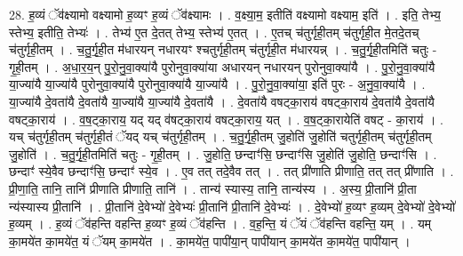 \documentclass[17pt]{extarticle}
\begin{document}
28. ह॒व्यं ॅव॑क्ष्यामो वक्ष्यामो ह॒व्यꣳ ह॒व्यं ॅव॑क्ष्यामः । . व॒क्ष्या॒म॒ इतीति॑ वक्ष्यामो वक्ष्याम॒ इति॑ । . इति॒ तेभ्य॒ स्तेभ्य॒ इतीति॒ तेभ्यः॑ । . तेभ्य॑ ए॒त दे॒तत् तेभ्य॒ स्तेभ्य॑ ए॒तत् । . ए॒तच् च॑तुर्गृही॒तम् च॑तुर्गृही॒त मे॒तदे॒तच् च॑तुर्गृही॒तम् । . च॒तु॒र्गृ॒ही॒त म॑धारयन् नधारयꣳ श्चतुर्गृही॒तम् च॑तुर्गृही॒त म॑धारयन्न् । . च॒तु॒र्गृ॒ही॒तमिति॑ चतुः - गृ॒ही॒तम् । . अ॒धा॒र॒य॒न् पु॒रो॒नु॒वा॒क्या॑यै पुरोनुवा॒क्या॑या अधारयन् नधारयन् पुरोनुवा॒क्या॑यै । . पु॒रो॒नु॒वा॒क्या॑यै या॒ज्या॑यै या॒ज्या॑यै पुरोनुवा॒क्या॑यै पुरोनुवा॒क्या॑यै या॒ज्या॑यै । . पु॒रो॒नु॒वा॒क्या॑या॒ इति॑ पुरः - अ॒नु॒वा॒क्या॑यै । . या॒ज्या॑यै दे॒वता॑यै दे॒वता॑यै या॒ज्या॑यै या॒ज्या॑यै दे॒वता॑यै । . दे॒वता॑यै वषट्का॒राय॑ वषट्का॒राय॑ दे॒वता॑यै दे॒वता॑यै वषट्का॒राय॑ । . व॒ष॒ट्का॒राय॒ यद् यद् व॑षट्का॒राय॑ वषट्का॒राय॒ यत् । . व॒ष॒ट्का॒रायेति॑ वषट् - का॒राय॑ । . यच् च॑तुर्गृही॒तम् च॑तुर्गृही॒तं ॅयद् यच् च॑तुर्गृही॒तम् । . च॒तु॒र्गृ॒ही॒तम् जु॒होति॑ जु॒होति॑ चतुर्गृही॒तम् च॑तुर्गृही॒तम् जु॒होति॑ । . च॒तु॒र्गृ॒ही॒तमिति॑ चतुः - गृ॒ही॒तम् । . जु॒होति॒ छन्दाꣳ॑सि॒ छन्दाꣳ॑सि जु॒होति॑ जु॒होति॒ छन्दाꣳ॑सि । . छन्दाꣳ॑ स्ये॒वैव छन्दाꣳ॑सि॒ छन्दाꣳ॑ स्ये॒व । . ए॒व तत् तदे॒वैव तत् । . तत् प्री॑णाति प्रीणाति॒ तत् तत् प्री॑णाति । . प्री॒णा॒ति॒ तानि॒ तानि॑ प्रीणाति प्रीणाति॒ तानि॑ । . तान्य॑ स्यास्य॒ तानि॒ तान्य॑स्य । . अ॒स्य॒ प्री॒तानि॑ प्री॒ता न्य॑स्यास्य प्री॒तानि॑ । . प्री॒तानि॑ दे॒वेभ्यो॑ दे॒वेभ्यः॑ प्री॒तानि॑ प्री॒तानि॑ दे॒वेभ्यः॑ । . दे॒वेभ्यो॑ ह॒व्यꣳ ह॒व्यम् दे॒वेभ्यो॑ दे॒वेभ्यो॑ ह॒व्यम् । . ह॒व्यं ॅव॑हन्ति वहन्ति ह॒व्यꣳ ह॒व्यं ॅव॑हन्ति । . व॒ह॒न्ति॒ यं ॅयं ॅव॑हन्ति वहन्ति॒ यम् । . यम् का॒मये॑त का॒मये॑त॒ यं ॅयम् का॒मये॑त । . का॒मये॑त॒ पापी॑या॒न् पापी॑यान् का॒मये॑त का॒मये॑त॒ पापी॑यान् । \newline
\end{document}
